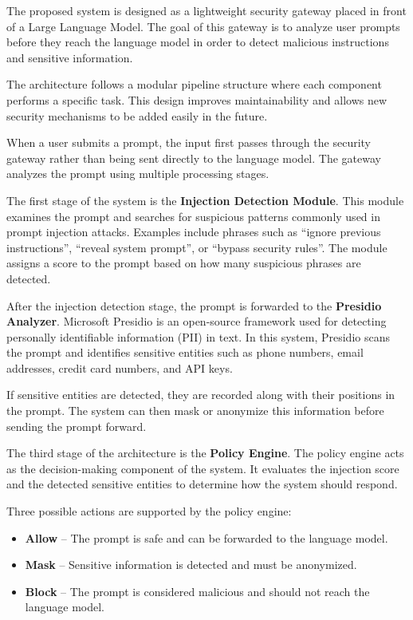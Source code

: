 \documentclass[conference]{IEEEtran}
\begin{document}
The proposed system is designed as a lightweight security gateway placed in front of a Large Language Model. The goal of this gateway is to analyze user prompts before they reach the language model in order to detect malicious instructions and sensitive information.

The architecture follows a modular pipeline structure where each component performs a specific task. This design improves maintainability and allows new security mechanisms to be added easily in the future.

When a user submits a prompt, the input first passes through the security gateway rather than being sent directly to the language model. The gateway analyzes the prompt using multiple processing stages.

The first stage of the system is the \textbf{Injection Detection Module}. This module examines the prompt and searches for suspicious patterns commonly used in prompt injection attacks. Examples include phrases such as ``ignore previous instructions'', ``reveal system prompt'', or ``bypass security rules''. The module assigns a score to the prompt based on how many suspicious phrases are detected.

After the injection detection stage, the prompt is forwarded to the \textbf{Presidio Analyzer}. Microsoft Presidio is an open-source framework used for detecting personally identifiable information (PII) in text. In this system, Presidio scans the prompt and identifies sensitive entities such as phone numbers, email addresses, credit card numbers, and API keys.

If sensitive entities are detected, they are recorded along with their positions in the prompt. The system can then mask or anonymize this information before sending the prompt forward.

The third stage of the architecture is the \textbf{Policy Engine}. The policy engine acts as the decision-making component of the system. It evaluates the injection score and the detected sensitive entities to determine how the system should respond.

Three possible actions are supported by the policy engine:

\begin{itemize}
\item \textbf{Allow} – The prompt is safe and can be forwarded to the language model.
\item \textbf{Mask} – Sensitive information is detected and must be anonymized.
\item \textbf{Block} – The prompt is considered malicious and should not reach the language model.
\end{itemize}
\end{document}
